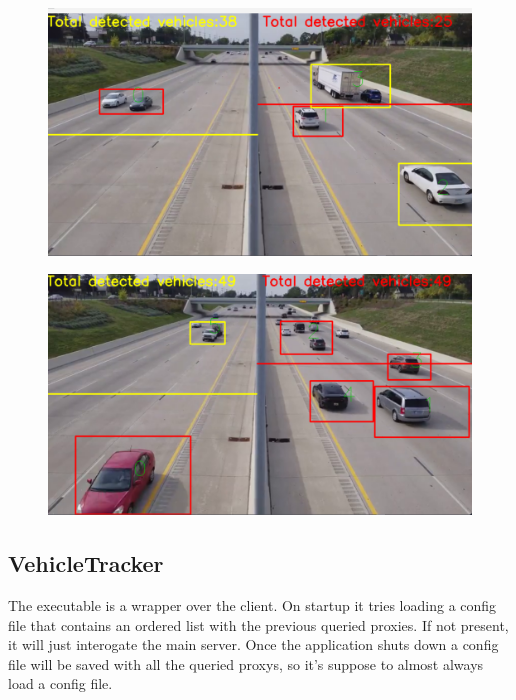 \documentclass[17pt]{article}
\begin{document}
\begin{figure}[h!]
    \includegraphics[width=\textwidth]{TrafficDetectionRunningExample.png}
    \label{fig:Running client sample}
\end{figure}

\begin{figure}[h!]
    \includegraphics[width=\textwidth]{TrafficDetectionRunningExample2.png}

    \label{fig:Running client sample2}
\end{figure}

\pagebreak
\subsection{VehicleTracker}
\indent \indent
The executable is a wrapper over the client. On startup it tries loading a
config file that contains an ordered list with the previous queried proxies.
If not present, it will just interogate the main server. Once the application
shuts down a config file will be saved with all the queried proxys, so it's
suppose to almost always load a config file.
\end{document}
